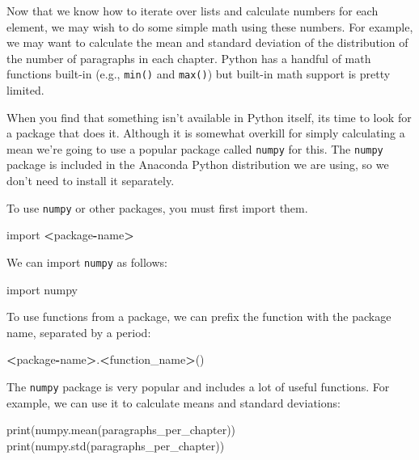 \documentclass[]{book}
\newenvironment{Shaded}{\begin{snugshade}}{\end{snugshade}}
\newcommand{\BuiltInTok}[1]{#1}
\newcommand{\ImportTok}[1]{#1}
\newcommand{\NormalTok}[1]{#1}
\newcommand{\OperatorTok}[1]{\textcolor[rgb]{0.81,0.36,0.00}{\textbf{#1}}}
\begin{document}
Now that we know how to iterate over lists and calculate numbers for each element, we may wish to do some simple math using these numbers. For example, we may want to calculate the mean and standard deviation of the distribution of the number of paragraphs in each chapter. Python has a handful of math functions built-in (e.g., \texttt{min()} and \texttt{max()}) but built-in math support is pretty limited.

When you find that something isn't available in Python itself, its time to look for a package that does it. Although it is somewhat overkill for simply calculating a mean we're going to use a popular package called \texttt{numpy} for this. The \texttt{numpy} package is included in the Anaconda Python distribution we are using, so we don't need to install it separately.

To use \texttt{numpy} or other packages, you must first import them.

\begin{Shaded}
\begin{Highlighting}[]
\ImportTok{import} \OperatorTok{<}\NormalTok{package}\OperatorTok{-}\NormalTok{name}\OperatorTok{>}
\end{Highlighting}
\end{Shaded}

We can import \texttt{numpy} as follows:

\begin{Shaded}
\begin{Highlighting}[]
\ImportTok{import}\NormalTok{ numpy}
\end{Highlighting}
\end{Shaded}

To use functions from a package, we can prefix the function with the package name, separated by a period:

\begin{Shaded}
\begin{Highlighting}[]
\OperatorTok{<}\NormalTok{package}\OperatorTok{-}\NormalTok{name}\OperatorTok{>}\NormalTok{.}\OperatorTok{<}\NormalTok{function_name}\OperatorTok{>}\NormalTok{()}
\end{Highlighting}
\end{Shaded}

The \texttt{numpy} package is very popular and includes a lot of useful functions. For example, we can use it to calculate means and standard deviations:

\begin{Shaded}
\begin{Highlighting}[]
\BuiltInTok{print}\NormalTok{(numpy.mean(paragraphs_per_chapter))}
\BuiltInTok{print}\NormalTok{(numpy.std(paragraphs_per_chapter))}
\end{Highlighting}
\end{Shaded}
\end{document}
